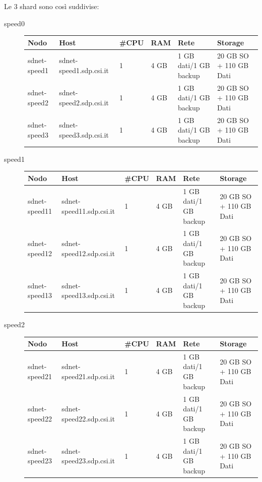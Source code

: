 \documentclass[a4paper,10pt,english]{sphinxmanual}
\begin{document}
Le 3 shard sono così suddivise:
\begin{description}
\item[{speed0}] \leavevmode
\begin{tabulary}{\linewidth}{|L|L|L|L|L|L|}
\hline
\textsf{\relax 
\textbf{Nodo}
} & \textsf{\relax 
\textbf{Host}
} & \textsf{\relax 
\textbf{\#CPU}
} & \textsf{\relax 
\textbf{RAM}
} & \textsf{\relax 
\textbf{Rete}
} & \textsf{\relax 
\textbf{Storage}
}\\
\hline
sdnet-speed1
 & 
sdnet-speed1.sdp.csi.it
 & 
1
 & 
4 GB
 & 
1 GB dati/1 GB backup
 & 
20 GB SO + 110 GB Dati
\\
\hline
sdnet-speed2
 & 
sdnet-speed2.sdp.csi.it
 & 
1
 & 
4 GB
 & 
1 GB dati/1 GB backup
 & 
20 GB SO + 110 GB Dati
\\
\hline
sdnet-speed3
 & 
sdnet-speed3.sdp.csi.it
 & 
1
 & 
4 GB
 & 
1 GB dati/1 GB backup
 & 
20 GB SO + 110 GB Dati
\\
\hline\end{tabulary}


\item[{speed1}] \leavevmode
\begin{tabulary}{\linewidth}{|L|L|L|L|L|L|}
\hline
\textsf{\relax 
\textbf{Nodo}
} & \textsf{\relax 
\textbf{Host}
} & \textsf{\relax 
\textbf{\#CPU}
} & \textsf{\relax 
\textbf{RAM}
} & \textsf{\relax 
\textbf{Rete}
} & \textsf{\relax 
\textbf{Storage}
}\\
\hline
sdnet-speed11
 & 
sdnet-speed11.sdp.csi.it
 & 
1
 & 
4 GB
 & 
1 GB dati/1 GB backup
 & 
20 GB SO + 110 GB Dati
\\
\hline
sdnet-speed12
 & 
sdnet-speed12.sdp.csi.it
 & 
1
 & 
4 GB
 & 
1 GB dati/1 GB backup
 & 
20 GB SO + 110 GB Dati
\\
\hline
sdnet-speed13
 & 
sdnet-speed13.sdp.csi.it
 & 
1
 & 
4 GB
 & 
1 GB dati/1 GB backup
 & 
20 GB SO + 110 GB Dati
\\
\hline\end{tabulary}


\item[{speed2}] \leavevmode
\begin{tabulary}{\linewidth}{|L|L|L|L|L|L|}
\hline
\textsf{\relax 
\textbf{Nodo}
} & \textsf{\relax 
\textbf{Host}
} & \textsf{\relax 
\textbf{\#CPU}
} & \textsf{\relax 
\textbf{RAM}
} & \textsf{\relax 
\textbf{Rete}
} & \textsf{\relax 
\textbf{Storage}
}\\
\hline
sdnet-speed21
 & 
sdnet-speed21.sdp.csi.it
 & 
1
 & 
4 GB
 & 
1 GB dati/1 GB backup
 & 
20 GB SO + 110 GB Dati
\\
\hline
sdnet-speed22
 & 
sdnet-speed22.sdp.csi.it
 & 
1
 & 
4 GB
 & 
1 GB dati/1 GB backup
 & 
20 GB SO + 110 GB Dati
\\
\hline
sdnet-speed23
 & 
sdnet-speed23.sdp.csi.it
 & 
1
 & 
4 GB
 & 
1 GB dati/1 GB backup
 & 
20 GB SO + 110 GB Dati
\\
\hline\end{tabulary}


\end{description}
\end{document}

